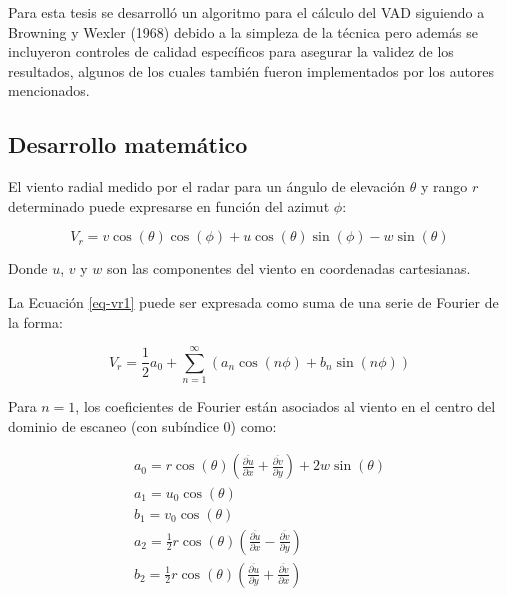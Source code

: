 \documentclass[12pt,spanish,oneside, a4paper]{book}
\begin{document}
Para esta tesis se desarrolló un algoritmo para el cálculo del VAD
siguiendo a Browning y Wexler (1968) debido a la simpleza de la técnica
pero además se incluyeron controles de calidad específicos para asegurar
la validez de los resultados, algunos de los cuales también fueron
implementados por los autores mencionados.

\subsection{Desarrollo matemático}\label{desarrollo-matematico}

El viento radial medido por el radar para un ángulo de elevación
\(\theta\) y rango \(r\) determinado puede expresarse en función del
azimut \(\phi\):

\begin{equation}
\label{eq-vr1}
V_r =  v \cos(\theta) \cos(\phi) + u \cos(\theta) \sin(\phi) - w \sin(\theta)
\end{equation}

Donde \(u\), \(v\) y \(w\) son las componentes del viento en coordenadas
cartesianas.

La Ecuación \ref{eq-vr1} puede ser expresada como suma de una serie de
Fourier de la forma:

\begin{equation}
\label{eq-vr2}
V_r =  \frac{1}{2}a_0 + \sum_{n = 1}^{\infty} (a_n \cos(n\phi) + b_n \sin(n \phi)) 
\end{equation}

Para \(n=1\), los coeficientes de Fourier están asociados al viento en
el centro del dominio de escaneo (con subíndice 0) como:

\begin{equation} \label{eq-vr3}
\begin{aligned}
a_0 = r \cos(\theta)\left ( \frac{\overline{\partial u}}{\partial x} + \frac{\overline{\partial v}}{\partial y} \right) + 2 w \sin(\theta) \\
a_1 = u_0 \cos(\theta) \\
b_1 = v_0 \cos(\theta) \\
a_2 = \frac{1}{2} r \cos(\theta)\left ( \frac{\overline{\partial u}}{\partial x} - \frac{\overline{\partial v}}{\partial y} \right) \\
b_2 = \frac{1}{2} r \cos(\theta)\left ( \frac{\overline{\partial u}}{\partial y} + \frac{\overline{\partial v}}{\partial x} \right)
\end{aligned}
\end{equation}
\end{document}
